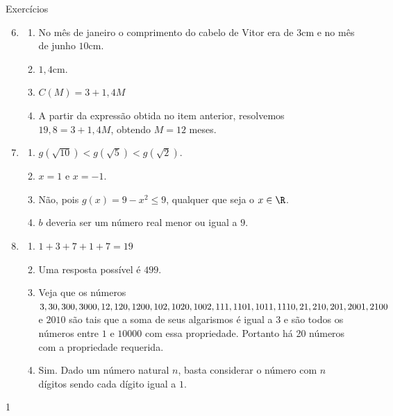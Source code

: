 \clearmargin
\begin{answer}{Exercícios}
{\exerciselist
  \begin{enumerate}\setcounter{enumi}{5}
  \item 
  \begin{enumerate}
  \item No mês de janeiro o comprimento do cabelo de Vitor era de $3$cm e no mês de junho $10$cm.
  \item $1{,}4$cm.
  \item $C(M)=3+1{,}4M$
  \item A partir da expressão obtida no item anterior, resolvemos $19{,}8=3+1{,}4M$, obtendo $M=12$ meses.
  \end{enumerate}
  \item
  \begin{enumerate}
  \item $g(\sqrt{10})<g(\sqrt{5})<g(\sqrt{2})$.
  \item $x=1$ e $x=-1$.
  \item Não, pois $g(x)=9-x^2\leq 9$, qualquer que seja o $x\in\R$.
  \item $b$ deveria ser um número real menor ou igual a $9$.
  \end{enumerate}
  \item
  \begin{enumerate}
  \item $1+3+7+1+7=19$
  \item Uma resposta possível é $499$.
  \item Veja que os números $3,30,300,3000,12,120,1200,102,1020,\\1002,111,1101,1011,1110,21,210,201,2001,2100$ e $2010$ são tais que a soma de seus algarismos é igual a $3$ e são todos os números entre $1$ e $10000$ com essa propriedade. Portanto há 20 números com a propriedade requerida.
  \item Sim. Dado um número natural $n$, basta considerar o número com $n$ dígitos sendo cada dígito igual a $1$.
  \end{enumerate}
  \end{enumerate}
}{1}
\end{answer}

